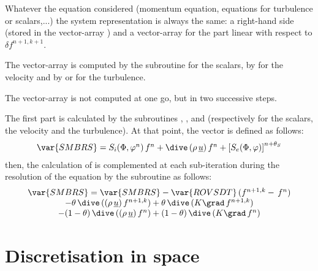 Whatever the equation considered (momentum equation, equations for
turbulence or scalars,...) the system representation is always the same: a
right-hand side (stored in the vector-array ) and a vector-array %
 for the part linear with respect to $\delta f^{n+1,k+1}$.%
\newline

\begin{description}
\item The vector-array  is computed by the subroutine %
 for the scalars, by  for the velocity and by %
 or  for the turbulence.

\item The vector-array  is not computed at one go, but in two
successive steps.\newline
\end{description}

The first part is calculated by the subroutines , %
,  and  (respectively for the scalars, the
velocity and the turbulence). At that point, the vector  is
defined as follows:
\begin{equation}
\begin{array}{c}
\var{SMBRS}=S_{i}(\Phi ,\varphi ^{n})\,f^{n}+\dive\,(\rho \,\underline{u}%
)\,f^{n}+\left[ S_{e}(\Phi ,\varphi )\right] ^{n+\theta _{S}}%
\end{array}%
\end{equation}%
then, the calculation of  is complemented at each sub-iteration
during the resolution of the equation by the subroutine  as
follows:
\begin{equation}
\begin{array}{c}
\var{SMBRS}=\var{SMBRS}-\var{ROVSDT}\,(f^{n+1,k}-\,f^{n}) \\
-\theta \,\dive\,((\rho \,\underline{u})\,f^{n+1,k})+\theta \,\dive\,(K\grad%
\,f^{n+1,k}) \\
-(1-\theta )\,\dive\,((\rho \,\underline{u})\,f^{n})+(1-\theta )\,\dive\,(K%
\grad\,f^{n})%
\end{array}%
\end{equation}

\newpage %

\section*{Discretisation in space}

